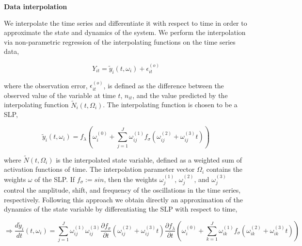 \documentclass[11pt, oneside]{article}
\begin{document}
\textbf{Data interpolation}

We interpolate the time series and differentiate it with respect to time in order to approximate the state and dynamics of the system.
We perform the interpolation via non-parametric regression of the interpolating functions on the time series data,


\vspace{-0.5cm}
\begin{equation}
    Y_{it} = \tilde{y}_i(t,\omega_i) + \epsilon^{(o)}_{it}
\end{equation}


where the observation error, $\epsilon^{(o)}_{it}$, is defined as the difference between the observed value of the variable at time $t$, $n_{it}$, and the value predicted by the interpolating function $\tilde{N}_i(t,\Omega_i)$. 
The interpolating function is chosen to be a SLP,

\vspace{-0.5cm}
\begin{equation}
    \tilde{y}_i (t,\omega_i) = f_\lambda \left( \omega_i^{(0)} + \sum_{j=1}^{J} \omega^{(1)}_{ij} f_\sigma \left( \omega^{(2)}_{ij} + \omega^{(3)}_{ij} t \right) \right)
\end{equation}

where $\tilde{N}(t,\Omega_i)$ is the interpolated state variable, defined as a weighted sum of activation functions of time.
The interpolation parameter vector $\Omega_i$ contains the weights $\omega$ of the SLP.
If $f_\sigma := sin$, then the weights $\omega^{(1)}_{j}$, $\omega^{(2)}_{j}$, and $\omega^{(3)}_{j}$ control the amplitude, shift, and frequency of the oscillations in the time series, respectively.
Following this approach we obtain directly an approximation of the dynamics of the state variable by differentiating the SLP with respect to time,

\vspace{-0.5cm}
\begin{equation}
    \Rightarrow \frac{d\tilde{y}_i}{dt} (t, \omega_i) = \sum_{j=1}^{J} \omega^{(1)}_{ij} \omega^{(3)}_{ij} \frac{\partial f_\sigma}{\partial t} \left(\omega^{(2)}_{ij} + \omega^{(3)}_{ij} t \right) \frac{\partial f_\lambda}{\partial t} \left ( \omega^{(0)}_{i} + \sum_{k=1}^{J} \omega^{(1)}_{ik} f_\sigma \left( \omega^{(2)}_{ik} + \omega^{(3)}_{ik} t \right) \right ) 
\end{equation}
\end{document}
